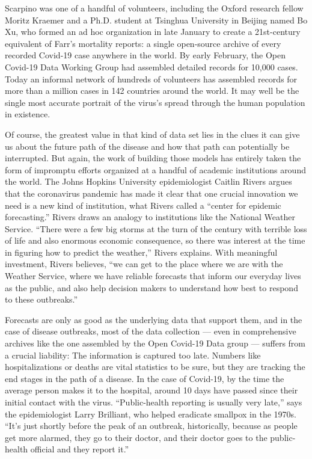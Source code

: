 Scarpino was one of a handful of volunteers, including the Oxford
research fellow Moritz Kraemer and a Ph.D. student at Tsinghua
University in Beijing named Bo Xu, who formed an ad hoc organization in
late January to create a 21st-century equivalent of Farr's mortality
reports: a single open-source archive of every recorded Covid-19 case
anywhere in the world. By early February, the Open Covid-19 Data Working
Group had assembled detailed records for 10,000 cases. Today an informal
network of hundreds of volunteers has assembled records for more than a
million cases in 142 countries around the world. It may well be the
single most accurate portrait of the virus's spread through the human
population in existence.

Of course, the greatest value in that kind of data set lies in the clues
it can give us about the future path of the disease and how that path
can potentially be interrupted. But again, the work of building those
models has entirely taken the form of impromptu efforts organized at a
handful of academic institutions around the world. The Johns Hopkins
University epidemiologist Caitlin Rivers argues that the coronavirus
pandemic has made it clear that one crucial innovation we need is a new
kind of institution, what Rivers called a ``center for epidemic
forecasting.'' Rivers draws an analogy to institutions like the National
Weather Service. ``There were a few big storms at the turn of the
century with terrible loss of life and also enormous economic
consequence, so there was interest at the time in figuring how to
predict the weather,'' Rivers explains. With meaningful investment,
Rivers believes, ``we can get to the place where we are with the Weather
Service, where we have reliable forecasts that inform our everyday lives
as the public, and also help decision makers to understand how best to
respond to these outbreaks.''

Forecasts are only as good as the underlying data that support them, and
in the case of disease outbreaks, most of the data collection --- even
in comprehensive archives like the one assembled by the Open Covid-19
Data group --- suffers from a crucial liability: The information is
captured too late. Numbers like hospitalizations or deaths are vital
statistics to be sure, but they are tracking the end stages in the path
of a disease. In the case of Covid-19, by the time the average person
makes it to the hospital, around 10 days have passed since their initial
contact with the virus. ``Public-health reporting is usually very
late,'' says the epidemiologist Larry Brilliant, who helped eradicate
smallpox in the 1970s. ``It's just shortly before the peak of an
outbreak, historically, because as people get more alarmed, they go to
their doctor, and their doctor goes to the public-health official and
they report it.''

